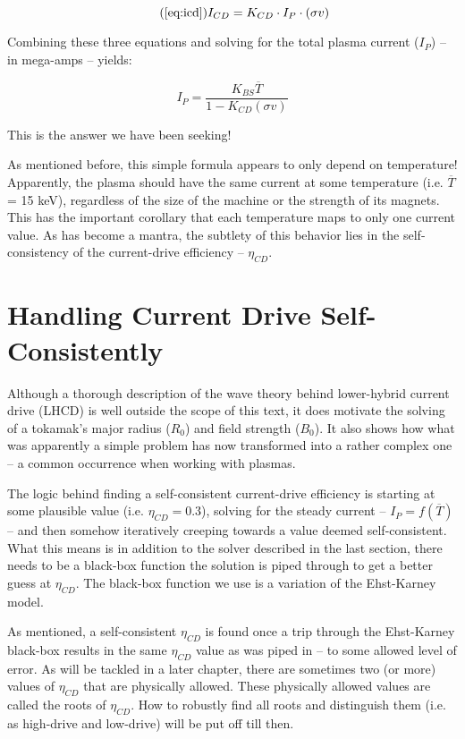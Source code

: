 \documentclass[11pt]{book}
\begin{document}
\begin{equation}
	\tag{\ref{eq:icd}}
	I_{CD} = K_{CD} \cdot I_P \cdot ( \sigma v )
\end{equation}

Combining these three equations and solving for the total plasma current ($I_P$) -- in mega-amps -- yields:

\begin{equation}
	I_P = \frac{ K_{BS} \overline T }{ 1 - K_{CD} ( \sigma v ) }
\end{equation}

This is the answer we have been seeking!

As mentioned before, this simple formula appears to only depend on temperature! Apparently, the plasma should have the same current at some temperature (i.e. $\overline T$ = 15 keV), regardless of the size of the machine or the strength of its magnets. This has the important corollary that each temperature maps to only one current value. As has become a mantra, the subtlety of this behavior lies in the self-consistency of the current-drive efficiency -- $\eta_{CD}$.

\section{Handling Current Drive Self-Consistently}

Although a thorough description of the wave theory behind lower-hybrid current drive (LHCD) is well outside the scope of this text, it does motivate the solving of a tokamak's major radius ($R_0$) and field strength ($B_0$). It also shows how what was apparently a simple problem has now transformed into a rather complex one -- a common occurrence when working with plasmas.

The logic behind finding a self-consistent current-drive efficiency is starting at some plausible value (i.e. $\eta_{CD} = 0.3$), solving for the steady current -- $I_P = f(\overline T)$ -- and then somehow iteratively creeping towards a value deemed self-consistent. What this means is in addition to the solver described in the last section, there needs to be a black-box function the solution is piped through to get a better guess at $\eta_{CD}$. The black-box function we use is a variation of the Ehst-Karney model.

As mentioned, a self-consistent $\eta_{CD}$ is found once a trip through the Ehst-Karney black-box results in the same $\eta_{CD}$ value as was piped in -- to some allowed level of error. As will be tackled in a later chapter, there are sometimes two (or more) values of $\eta_{CD}$ that are physically allowed. These physically allowed values are called the roots of $\eta_{CD}$. How to robustly find all roots and distinguish them (i.e. as high-drive and low-drive) will be put off till then.
\end{document}
